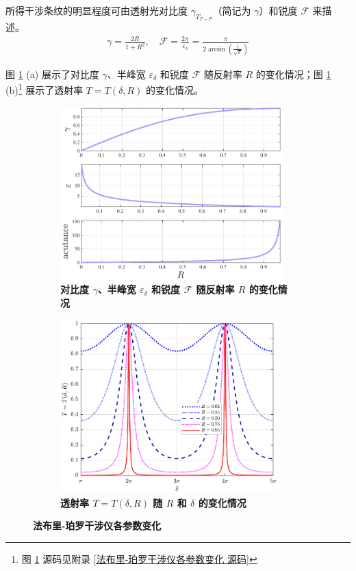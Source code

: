 \documentclass[UTF8]{report}
\theoremstyle{MyLineTheoremStyle} %
\theoremstyle{MyBlockTheoremStyle} %
\theoremstyle{MySubsubsectionStyle} %
\begin{document}
所得干涉条纹的明显程度可由透射光对比度 $\gamma_{T_{F-P}}$（简记为 $\gamma$）和锐度 $\mathscr{F}$ 来描述。
\begin{gather}
\gamma = \frac{2R}{1 + R^2}
,\quad 
\mathscr{F} = \frac{2\pi}{\varepsilon_{\delta}} = \frac{\pi}{2 \arcsin \left(\frac{1}{\sqrt{F}}\right)}
\end{gather}

图 \ref{法布里-珀罗干涉仪各参数变化} (a) 展示了对比度 $\gamma$、半峰宽 $\varepsilon_{\delta}$ 和锐度 $\mathscr{F}$ 随反射率 $R$ 的变化情况；图 \ref{法布里-珀罗干涉仪各参数变化} (b)\footnote{图 \ref{法布里-珀罗干涉仪各参数变化} 源码见附录 \ref{法布里-珀罗干涉仪各参数变化 源码}} 展示了透射率 $T = T(\delta, R)$ 的变化情况。

\begin{figure}[H]\centering
\begin{subfigure}[t]{0.49\columnwidth}\centering
    \includegraphics[height=190pt]{assets/3/对比度、半峰宽和锐度随反射率 R 的变化情况.pdf}
    \caption{\bfseries 对比度 $\gamma$、半峰宽 $\varepsilon_{\delta}$ 和锐度 $\mathscr{F}$ 随反射率 $R$ 的变化情况 }
\end{subfigure}\hfill
\begin{subfigure}[t]{0.49\columnwidth}\centering
    \includegraphics[height=190pt]{assets/3/透射率 T 随 R 和 delta 的变化.pdf}
    \caption{\bfseries 透射率 $T = T(\delta, R)$ 随 $R$ 和 $\delta$ 的变化情况 }
\end{subfigure}
\caption{\bfseries 法布里-珀罗干涉仪各参数变化 }\label{法布里-珀罗干涉仪各参数变化}
\end{figure}
\end{document}
